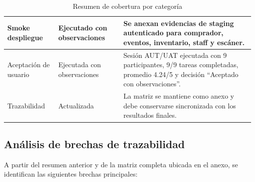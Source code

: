 \documentclass[12pt,letterpaper]{article}
\begin{document}
\begin{table}[H]
\begin{tabularx}{\textwidth}{|
>{\raggedright\arraybackslash}p{3.5cm}|
>{\raggedright\arraybackslash}p{3.8cm}|
>{\raggedright\arraybackslash}X|}
Smoke despliegue &
Ejecutado con observaciones &
Se anexan evidencias de staging autenticado para comprador, eventos, inventario, staff y escáner. \\
\hline

Aceptación de usuario &
Ejecutada con observaciones &
Sesión AUT/UAT ejecutada con 9 participantes, 9/9 tareas completadas, promedio 4.24/5 y decisión ``Aceptado con observaciones''. \\
\hline

Trazabilidad &
Actualizada &
La matriz se mantiene como anexo y debe conservarse sincronizada con los resultados finales. \\
\hline

\end{tabularx}

\endgroup
\caption{Resumen de cobertura por categoría}
\label{tab:resumen-cobertura-trazabilidad}
\end{table}

\subsection{Análisis de brechas de trazabilidad}

A partir del resumen anterior y de la matriz completa ubicada en el anexo, se identifican las siguientes brechas principales:
\end{document}
